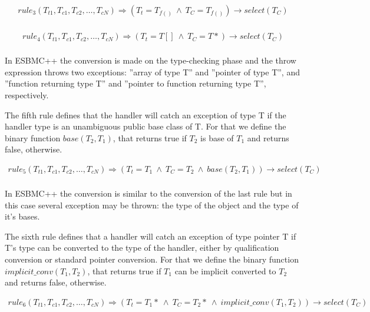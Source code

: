 \documentclass[conference]{IEEEtran}
\begin{document}
{\[\begin{array}{ll}
rule_3(T_{t1},T_{c1}, T_{c2}, \ldots, T_{cN}) \Longrightarrow
  (T_{t} = T_{f()} \: \wedge \: T_{C} = T_{f()})\rightarrow select(T_{C}) \\
\end{array}\]

\[\begin{array}{ll}
rule_4(T_{t1},T_{c1}, T_{c2}, \ldots, T_{cN}) \Longrightarrow
  (T_{t} = T[] \: \wedge \: T_{C} = T*)\rightarrow select(T_{C}) \\
\end{array}\]

In ESBMC++ the conversion is made on the type-checking phase and the throw
expression throws two exceptions: ''array of type T'' and ''pointer of type
T'', and ''function returning type T'' and ''pointer to function returning
type T'', respectively.

The fifth rule defines that the handler will catch an exception of type T
if the handler type is an unambiguous public base class of T.
For that we define the binary function $base(T_{2}, T_{1})$, that returns
true if $T_{2}$ is base of $T_{1}$ and returns false, otherwise.

\[\begin{array}{ll}
rule_5(T_{t1},T_{c1}, T_{c2}, \ldots, T_{cN}) \Longrightarrow
  (T_{t} = T_{1} \: \wedge \: T_{C} = T_{2} \: \wedge \: base(T_{2}, T_{1}))\rightarrow select(T_{C}) \\
\end{array}\]

In ESBMC++ the conversion is similar to the conversion of the last rule
but in this case several exception may be thrown: the type of the object
and the type of it's bases.

The sixth rule defines that a handler will catch an exception of type
pointer T if T's type can be converted to the type of the handler, either by
qualification conversion or standard pointer conversion.
For that we define the binary function $implicit\_conv(T_{1}, T_{2})$, that
returns true if $T_{1}$ can be implicit converted to $T_{2}$ and returns false,
otherwise.

\[\begin{array}{ll}
rule_6(T_{t1},T_{c1}, T_{c2}, \ldots, T_{cN}) \Longrightarrow
  (T_{t} = T_{1}* \: \wedge \: T_{C} = T_{2}* \: \wedge \: implicit\_conv(T_{1}, T_{2}))\rightarrow select(T_{C}) \\
\end{array}\]

}
\end{document}
